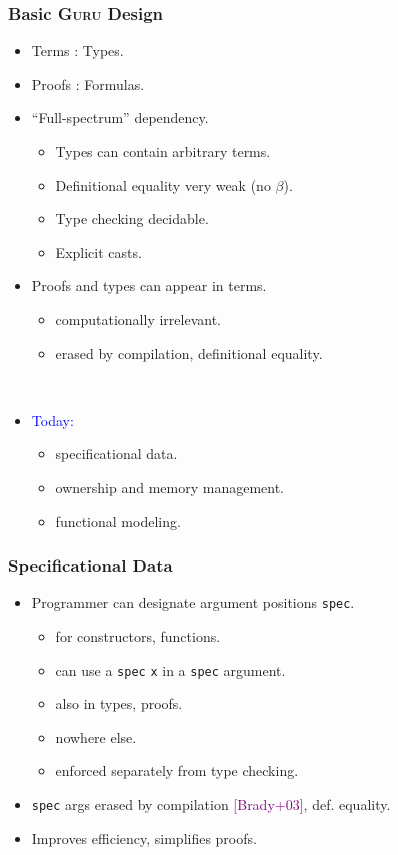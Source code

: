 \documentclass[11pt]{beamer}
\begin{document}
\begin{frame}
  \frametitle{Basic \textsc{Guru} Design}

\begin{itemize}

\item Terms : Types.
\item Proofs : Formulas.
\item ``Full-spectrum'' dependency.
\begin{itemize}
\item Types can contain arbitrary terms.
\item Definitional equality very weak (no $\beta$).
\item Type checking decidable.
\item Explicit casts.
\end{itemize}
\item Proofs and types can appear in terms.
\begin{itemize}
\item computationally irrelevant.
\item erased by compilation, definitional equality.
\end{itemize}

\ 

\item \textcolor{blue}{Today:} 
\begin{itemize}

\item specificational data.
\item ownership and memory management.
\item functional modeling.

\end{itemize}

\end{itemize}


\end{frame}

\begin{frame}
  \frametitle{Specificational Data}

\begin{itemize}

\item Programmer can designate argument positions \texttt{spec}.

\begin{itemize}
\item for constructors, functions.
\item can use a \texttt{spec} \texttt{x} in a \texttt{spec} argument.
\item also in types, proofs.
\item nowhere else.
\item enforced separately from type checking.
\end{itemize}

\item \texttt{spec} args erased by compilation \textcolor{purple}{[Brady+03]}, def. equality.

\item Improves efficiency, simplifies proofs.

\end{itemize}
\end{frame}
\end{document}
